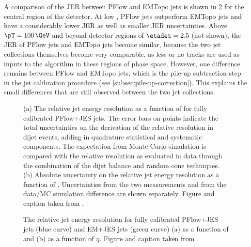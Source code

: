 A comparison of the JER between PFlow and EMTopo jets is shown in \cref{fig:jer-combination-results} for the central region of the detector.
At low \pT, PFlow jets outperform EMTopo jets and have a considerably lower JER as well as smaller JER uncertainties.
Above $\pT=100\,\GeV$ and beyond detector regions of $\etadet = 2.5$ (not shown), the JER of PFlow jets and EMTopo jets become similar, because the two jet collections themselves become very comparable, as less or no tracks are used as inputs to the \antikt algorithm in these regions of phase space. However, one difference remains between PFlow and EMTopo jets, which is the pile-up subtraction step in the jet calibration procedure (see \cref{subsec:pile-up-correction}). This explains the small differences that are still observed between the two jet collections.

\FloatBarrier
\begin{figure}[t]
    \caption{(a) The relative jet energy resolution as a function of \pT for fully calibrated PFlow+JES jets. The error bars on points indicate the total uncertainties on the derivation of the relative resolution in dijet events, adding in quadrature statistical and systematic components. The expectation from Monte Carlo simulation is compared with the relative resolution as evaluated in data through the combination of the dijet balance and random cone techniques. (b) Absolute uncertainty on the relative jet energy resolution as a function of \pTjet. Uncertainties from the two \insitu measurements and from the data/MC simulation difference are shown separately. Figure and caption taken from .}
    \label{fig:jer-combination-incl-noise-term}
\end{figure}
\begin{figure}[t]
    \caption{The relative jet energy resolution for fully calibrated PFlow+JES jets (blue curve) and EM+JES jets (green curve) (a) as a function of \pTjet and (b) as a function of $\eta$. Figure and caption taken from .}
    \label{fig:jer-combination-results}
\end{figure}

